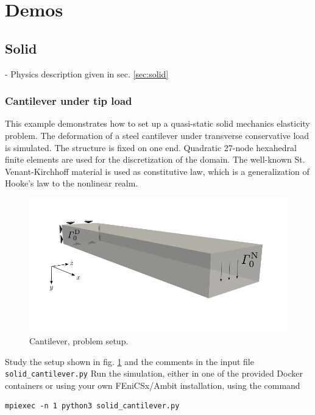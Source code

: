 \documentclass[a4paper,12pt]{report}
\begin{document}
\section{Demos}\label{sec:demos}

\subsection{Solid}\label{subsec:demos:solid}

- Physics description given in sec. \ref{sec:solid}

\subsubsection*{Cantilever under tip load}

This example demonstrates how to set up a quasi-static solid mechanics elasticity problem. The deformation of a steel cantilever under transverse conservative load is simulated. The structure is fixed on one end. Quadratic 27-node hexahedral finite elements are used for the discretization of the domain. The well-known St. Venant-Kirchhoff material is used as constitutive law, which is a generalization of Hooke's law to the nonlinear realm.\\

\begin{figure}
\centering
\includegraphics[width=0.7\columnwidth]{fig/cantilever_setup}
\caption{Cantilever, problem setup.}
\label{fig:cantilever_setup}
\end{figure}

Study the setup shown in fig. \ref{fig:cantilever_setup} and the comments in the input file \verb"solid_cantilever.py" Run the simulation, either in one of the provided Docker containers or using your own FEniCSx/Ambit installation, using the command

\begin{verbatim}
mpiexec -n 1 python3 solid_cantilever.py
\end{verbatim}
\end{document}
